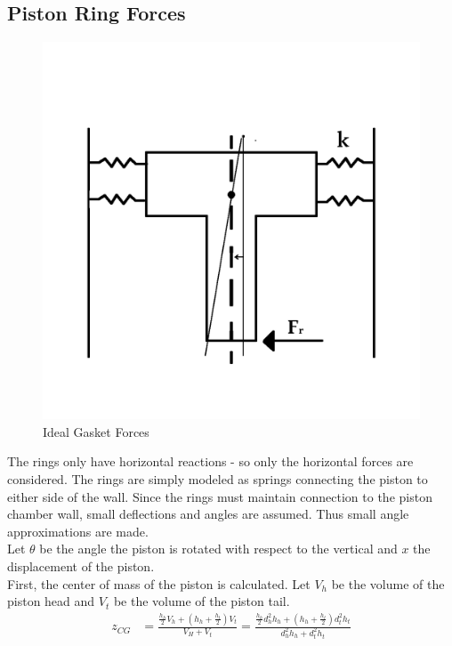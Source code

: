 \documentclass[10pt,a4paper]{article}
\begin{document}
\subsection*{Piston Ring Forces}
	\begin{figure}[h]
		\centering
		\includegraphics[width=.75\textwidth]{PistonDiagram.png}
		\caption{Ideal Gasket Forces}
		\label{fig:diagram1}
	\end{figure}
	The rings only have horizontal reactions - so only the horizontal forces are considered.
	The rings are simply modeled as springs connecting the piston to either side of the wall. Since the rings must maintain connection to the piston chamber wall, small deflections and angles are assumed. Thus small angle approximations are made.\\ Let $\theta$ be the angle the piston is rotated with respect to the vertical and $x$ the displacement of the piston.\\
	First, the center of mass of the piston is calculated. Let $V_h$ be the volume of the piston head and $V_t$ be the volume of the piston tail.
	\begin{align*}
		z_{CG} &= \frac{\frac{h_h}{2} V_h + (h_h+ \frac{h_t}{2}) V_t}{V_H + V_t} = \frac{\frac{h_h}{2}d_h^2 h_h + (h_h+ \frac{h_t}{2}) d_t^2 h_t}{d_h^2 h_h + d_t^2 h_t }
	\end{align*}
	
\end{document}
